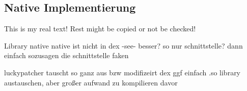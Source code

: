 \subsection{Native Implementierung} \label{subsection:counter-modifications-dynamic}
This is my real text! Rest might be copied or not be checked!


Library native\newline
native ist nicht in dex -see- besser?\newline
so nur schnittstelle? dann einfach sozusagen die schnittstelle faken\newline

luckypatcher tauscht so ganz aus bzw modifizeirt dex\newline
ggf einfach .so library austauschen, aber großer aufwand zu kompilieren davor\newline
